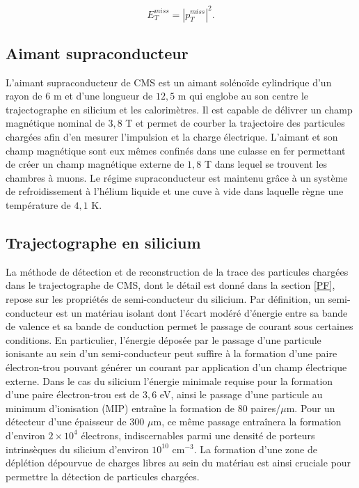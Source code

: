 $$E^{miss}_T=|p_T^{miss}|^2.$$




\subsection{Aimant supraconducteur}

L'aimant supraconducteur de CMS est un aimant solénoïde cylindrique d'un rayon de $6$ m et d'une longueur de $12,5$ m qui englobe au son centre le trajectographe en silicium et les calorimètres. Il est capable de délivrer un champ magnétique nominal de $3,8$ T et permet de courber la trajectoire des particules chargées afin d'en mesurer l'impulsion et la charge électrique. L'aimant et son champ magnétique sont eux mêmes confinés dans une culasse en fer permettant de créer un champ magnétique externe de $1,8$ T dans lequel se trouvent les chambres à muons. Le régime supraconducteur est maintenu grâce à un système de refroidissement à l'hélium liquide et une cuve à vide dans laquelle règne une température de $4,1$ K.

\subsection{Trajectographe en silicium}

La méthode de détection et de reconstruction de la trace des particules chargées dans le trajectographe de CMS, dont le détail est donné dans la section \ref{PF}, repose sur les propriétés de semi-conducteur du silicium. Par définition, un semi-conducteur est un matériau isolant dont l'écart modéré d'énergie entre sa bande de valence et sa bande de conduction permet le passage de courant sous certaines conditions. En particulier, l'énergie déposée par le passage d'une particule ionisante au sein d'un semi-conducteur peut suffire à la formation d'une paire électron-trou pouvant générer un courant par application d'un champ électrique externe. Dans le cas du silicium l'énergie minimale requise pour la formation d'une paire électron-trou est de $3,6$ eV, ainsi le passage d'une particule au minimum d'ionisation (MIP) entraîne la formation de $80$ paires/$\mu$m. Pour un détecteur d'une épaisseur de $300$ $\mu$m, ce même passage entraînera la formation d'environ $2\times10^4$ électrons, indiscernables parmi une densité de porteurs intrinsèques du silicium d'environ $10^{10}$ cm$^{-3}$. La formation d'une zone de déplétion dépourvue de charges libres au sein du matériau est ainsi cruciale pour permettre la détection de particules chargées. \\

